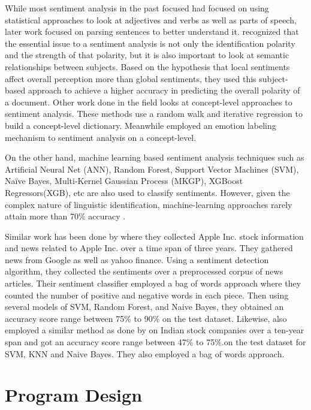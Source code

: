 \documentclass{acm_proc_article-sp}
\begin{document}
While most sentiment analysis in the past focused had focused on using statistical approaches to look at adjectives and verbs as well as parts of speech, later work focused on parsing sentences to better understand it. \cite{nasukawa_sentiment_2003} recognized that the essential issue to a sentiment analysis is not only the identification polarity and the strength of that polarity, but it is also important to look at semantic relationships between subjects. Based on the hypothesis that local sentiments affect overall perception more than global sentiments, they used this subject-based approach to achieve a higher accuracy in predicting the overall polarity of a document. Other work done in the field looks at concept-level approaches to sentiment analysis. These methods use a random walk and iterative regression to build a concept-level dictionary. Meanwhile \cite{poria_enhanced_2013} employed an emotion labeling mechanism to sentiment analysis on a concept-level.\cite{takala_gold-standard_2014}

On the other hand, machine learning based sentiment analysis techniques such as Artificial Neural Net (ANN), Random Forest, Support Vector Machines (SVM), Naïve Bayes, Multi-Kernel Gaussian Process (MKGP), XGBoost Regressors(XGB), etc are also used to classify sentiments. However, given the complex nature of linguistic identification, machine-learning approaches rarely attain more than 70\% accuracy \cite{takala_gold-standard_2014}. 

Similar work has been done by \cite{kalyani_stock_2016} where they collected Apple Inc. stock information and news related to Apple Inc. over a time span of three years. They gathered news from Google as well as yahoo finance. Using a sentiment detection algorithm, they collected the sentiments over a preprocessed corpus of news articles. Their sentiment classifier employed a bag of words approach where they counted the number of positive and negative words in each piece. Then using several models of SVM, Random Forest, and Naive Bayes, they obtained an accuracy score range between 75\% to 90\% on the test dataset. Likewise, \cite{kirange_open_nodate} also employed a similar method as done by \cite{kalyani_stock_2016} on Indian stock companies over a ten-year span and got an accuracy score range between 47\% to 75\%.on the test dataset for SVM, KNN and Naive Bayes. They also employed a bag of words approach.



\section{Program Design}
\end{document}
